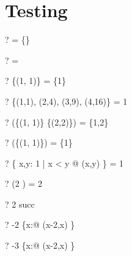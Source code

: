 \documentclass{article}
\newcommand{\negate}{-}
\begin{document}
\section{Testing \dom}
\begin{zed} \vdash? \dom \emptyset = \{\} \end{zed}
\begin{zed} \vdash? \dom \emptyset = \emptyset \end{zed}
\begin{zed} \vdash? \dom \{(1, 1)\} = \{1\} \end{zed}
\begin{zed} \vdash? \dom \{(1,1), (2,4), (3,9), (4,16)\} = 1  \end{zed}
\begin{zed} \vdash? \dom (\{(1, 1)\} \cup \{(2,2)\}) = \{1,2\} \end{zed}
\begin{zed} \vdash? \dom (\emptyset \cup \{(1, 1)\}) = \{1\} \end{zed}
\begin{zed} \vdash? \dom \{ x,y: 1  | x < y @ (x,y) \} = 1  \end{zed}
\begin{zed} \vdash? \dom (2   ) = 2  \end{zed}
\begin{zed} \vdash? 2 \in \dom succ \end{zed}
\begin{zed} \vdash? \negate 2 \in \dom \{x:\nat @ (x-2,x) \} \end{zed}
\begin{zed} \vdash? \negate 3 \notin \dom \{x:\nat @ (x-2,x) \} \end{zed}
\end{document}
